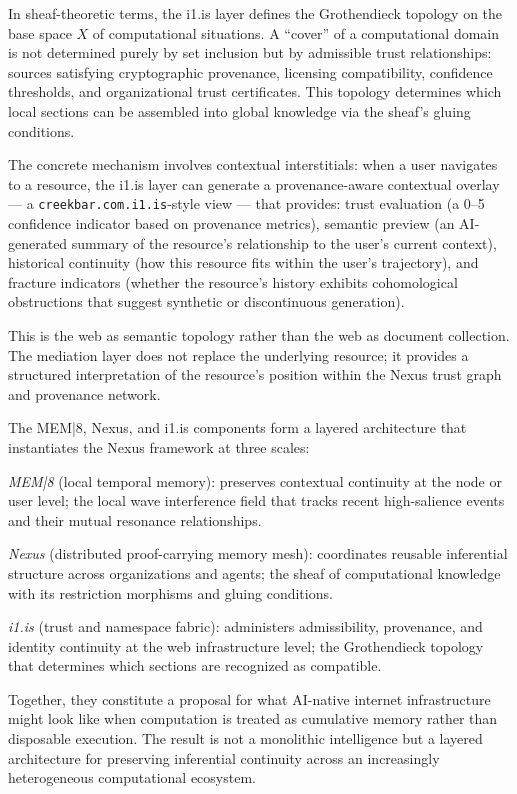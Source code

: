 In sheaf-theoretic terms, the i1.is layer defines
the Grothendieck topology on the base space $X$ of
computational situations. A ``cover'' of a computational
domain is not determined purely by set inclusion but
by admissible trust relationships: sources satisfying
cryptographic provenance, licensing compatibility,
confidence thresholds, and organizational trust
certificates. This topology determines which local
sections can be assembled into global knowledge via
the sheaf's gluing conditions.

The concrete mechanism involves contextual interstitials:
when a user navigates to a resource, the i1.is layer
can generate a provenance-aware contextual overlay
--- a \texttt{creekbar.com.i1.is}-style view --- that
provides: trust evaluation (a 0--5 confidence indicator
based on provenance metrics), semantic preview (an
AI-generated summary of the resource's relationship
to the user's current context), historical continuity
(how this resource fits within the user's trajectory),
and fracture indicators (whether the resource's history
exhibits cohomological obstructions that suggest
synthetic or discontinuous generation).

This is the web as semantic topology rather than the
web as document collection. The mediation layer does
not replace the underlying resource; it provides a
structured interpretation of the resource's position
within the Nexus trust graph and provenance network.

The MEM|8, Nexus, and i1.is components form a layered
architecture that instantiates the Nexus framework
at three scales:

\textit{MEM|8} (local temporal memory): preserves
contextual continuity at the node or user level;
the local wave interference field that tracks recent
high-salience events and their mutual resonance
relationships.

\textit{Nexus} (distributed proof-carrying memory
mesh): coordinates reusable inferential structure
across organizations and agents; the sheaf of
computational knowledge with its restriction morphisms
and gluing conditions.

\textit{i1.is} (trust and namespace fabric): administers
admissibility, provenance, and identity continuity
at the web infrastructure level; the Grothendieck
topology that determines which sections are recognized
as compatible.

Together, they constitute a proposal for what AI-native
internet infrastructure might look like when computation
is treated as cumulative memory rather than disposable
execution. The result is not a monolithic intelligence
but a layered architecture for preserving inferential
continuity across an increasingly heterogeneous
computational ecosystem.

